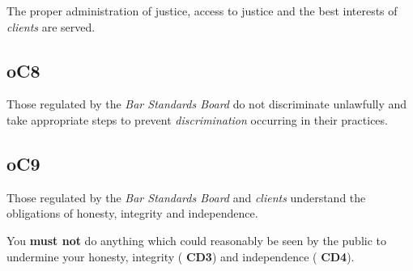The proper administration of justice, access to justice and the best
interests of \emph{clients} are served.

\subsection{\color{bleu}oC8}

Those regulated by the \emph{Bar Standards Board} do not discriminate
unlawfully and take appropriate steps to prevent \emph{discrimination}
occurring in their practices.

\subsection{\color{bleu}oC9}

Those regulated by the \emph{Bar Standards Board} and \emph{clients}
understand the obligations of honesty, integrity and independence.




You \textcolor{myred}{\textbf{must not}} do anything which could reasonably be seen by the public to
undermine your honesty, integrity ( \textbf{\textcolor{mygold}{CD3}}) and independence ( \textbf{\textcolor{mygold}{CD4}}).


